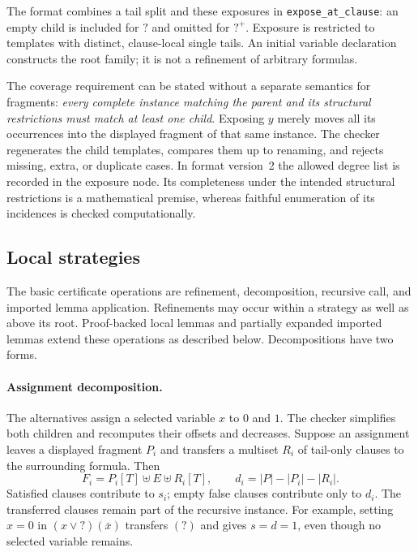 \documentclass[11pt]{article}
\newcommand{\anytail}{\mathord{?}}
\newcommand{\plustail}{\mathord{?}^{+}}
\theoremstyle{definition}
\theoremstyle{remark}
\begin{document}
The format combines a tail split and these exposures in
\texttt{expose\_at\_clause}: an empty child is included for $\anytail$ and omitted
for $\plustail$. Exposure is restricted to templates with distinct, clause-local
single tails. An initial variable declaration constructs the root family;
it is not a refinement of arbitrary formulas.

The coverage requirement can be stated without a separate semantics for
fragments: \emph{every complete instance matching the parent and its
structural restrictions must match at least one child}. Exposing $y$ merely
moves all its occurrences into the displayed fragment of that same instance.
The checker regenerates the child templates, compares them up to renaming,
and rejects missing, extra, or duplicate cases. In format version~2 the
allowed degree list is recorded in the exposure node. Its completeness under
the intended structural restrictions is a mathematical premise, whereas
faithful enumeration of its incidences is checked computationally.

\subsection{Local strategies}
\label{sec:strategies}

The basic certificate operations are refinement, decomposition, recursive
call, and imported lemma application. Refinements may occur within a strategy
as well as above its root. Proof-backed local lemmas and partially expanded
imported lemmas extend these operations as described below.
Decompositions have two forms.

\paragraph{Assignment decomposition.}
The alternatives assign a selected variable $x$ to $0$ and $1$. The checker
simplifies both children and recomputes their offsets and decreases. Suppose
an assignment leaves a displayed fragment $P_i$ and transfers a multiset $R_i$
of tail-only clauses to the surrounding formula. Then
\begin{equation}
 F_i=P_i[T]\uplus E\uplus R_i[T],\qquad
 d_i=|P|-|P_i|-|R_i|.
 \label{eq:transfer}
\end{equation}
Satisfied clauses contribute to $s_i$; empty false clauses contribute only to
$d_i$. The transferred clauses remain part of the recursive instance.
For example, setting $x=0$ in $(x\vee\anytail)(\bar x)$ transfers $(\anytail)$ and gives
$s=d=1$, even though no selected variable remains.
\end{document}
